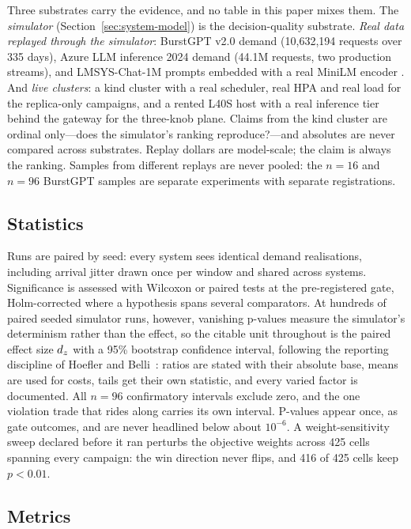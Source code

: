 Three substrates carry the evidence, and no table in this paper mixes
them. The \emph{simulator} (Section~\ref{sec:system-model}) is the
decision-quality substrate. \emph{Real data replayed through the
simulator}: BurstGPT v2.0 demand \citep{burstgpt2024} (10,632,194 requests
over 335 days), Azure LLM inference 2024 demand \citep{azurellmtrace2024}
(44.1M requests, two production streams), and LMSYS-Chat-1M prompts
\citep{lmsyschat1m2024} embedded with a real MiniLM encoder
\citep{minilm2020,sbert2019}. And \emph{live clusters}: a kind cluster with
a real scheduler, real HPA and real load for the replica-only campaigns,
and a rented L40S host with a real inference tier behind the gateway for
the three-knob plane. Claims from the kind cluster are ordinal only---does
the simulator's ranking reproduce?---and absolutes are never compared
across substrates. Replay dollars are model-scale; the claim is always the
ranking. Samples from different replays are never pooled: the $n = 16$ and
$n = 96$ BurstGPT samples are separate experiments with separate
registrations.

\subsection{Statistics}
\label{sec:method-stats}

Runs are paired by seed: every system sees identical demand realisations,
including arrival jitter drawn once per window and shared across systems.
Significance is assessed with Wilcoxon or paired tests at the
pre-registered gate, Holm-corrected \citep{holm1979} where a hypothesis
spans several comparators. At hundreds of paired seeded simulator runs,
however, vanishing p-values measure the simulator's determinism rather
than the effect, so the citable unit throughout is the paired effect size
$d_z$ with a 95\% bootstrap confidence interval, following the reporting
discipline of Hoefler and Belli~\citep{hoefler2015benchmarking}: ratios are stated with
their absolute base, means are used for costs, tails get their own
statistic, and every varied factor is documented. All $n = 96$ confirmatory
intervals exclude zero, and the one violation trade that rides along
carries its own interval. P-values appear once, as gate outcomes, and are
never headlined below about $10^{-6}$. A weight-sensitivity sweep declared
before it ran perturbs the objective weights across 425 cells spanning
every campaign: the win direction never flips, and 416 of 425 cells keep
$p < 0.01$.

\subsection{Metrics}
\label{sec:method-metrics}

